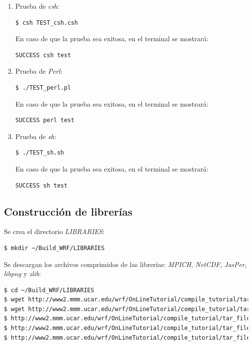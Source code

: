 \documentclass[12pt,letter]{article}
\begin{document}
\begin{enumerate}
\item Prueba de \textit{csh}:
\begin{lstlisting}[language=bash]
$ csh TEST_csh.csh
\end{lstlisting}

En caso de que la prueba sea exitosa, en el terminal se mostrar\'a:
\begin{lstlisting}[language=bash]
SUCCESS csh test
\end{lstlisting}

\item Prueba de \textit{Perl}:
\begin{lstlisting}[language=bash]
$ ./TEST_perl.pl
\end{lstlisting}

En caso de que la prueba sea exitosa, en el terminal se mostrar\'a:
\begin{lstlisting}[language=bash]
SUCCESS perl test
\end{lstlisting}

\item Prueba de \textit{sh}:
\begin{lstlisting}[language=bash]
$ ./TEST_sh.sh
\end{lstlisting}

En caso de que la prueba sea exitosa, en el terminal se mostrar\'a:
\begin{lstlisting}[language=bash]
SUCCESS sh test
\end{lstlisting}

\end{enumerate}

\subsection*{Construcci\'on de librer\'ias}

Se crea el directorio \textit{LIBRARIES}:

\begin{lstlisting}[language=bash]
$ mkdir ~/Build_WRF/LIBRARIES
\end{lstlisting}

\noindent Se descargan los archivos comprimidos de las librer\'ias: \textit{MPICH}, \textit{NetCDF}, \textit{JasPer}, \textit{libpng} y \textit{zlib}:
\begin{lstlisting}[language=bash]
$ cd ~/Build_WRF/LIBRARIES
$ wget http://www2.mmm.ucar.edu/wrf/OnLineTutorial/compile_tutorial/tar_files/mpich-3.0.4.tar.gz
$ wget http://www2.mmm.ucar.edu/wrf/OnLineTutorial/compile_tutorial/tar_files/netcdf-4.1.3.tar.gz
$ http://www2.mmm.ucar.edu/wrf/OnLineTutorial/compile_tutorial/tar_files/jasper-1.900.1.tar.gz
$ http://www2.mmm.ucar.edu/wrf/OnLineTutorial/compile_tutorial/tar_files/libpng-1.2.50.tar.gz
$ http://www2.mmm.ucar.edu/wrf/OnLineTutorial/compile_tutorial/tar_files/zlib-1.2.7.tar.gz
\end{lstlisting}
\end{document}
